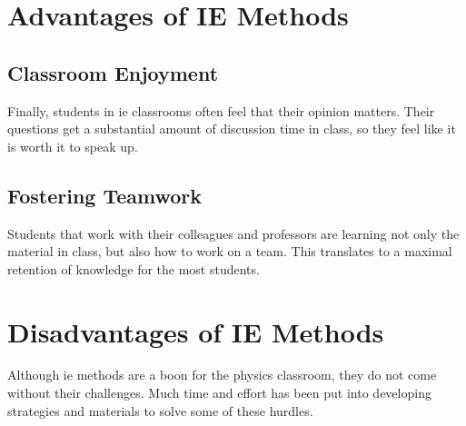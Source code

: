 
\section{Advantages of IE Methods}

\subsection{Classroom Enjoyment}

Finally, students in \gls{ie} classrooms often feel that their opinion matters. Their questions get a substantial amount of discussion time in class, so they feel like it is worth it to speak up.
%
%
%
\subsection{Fostering Teamwork}

Students that work with their colleagues and professors are learning not only the material in class, but also how to work on a team. This translates to a maximal retention of knowledge for the most students\cite{novak1999}.

\section{Disadvantages of IE Methods}

Although \gls{ie} methods are a boon for the physics classroom, they do not come without their challenges. Much time and effort has been put into developing strategies and materials to solve some of these hurdles.

